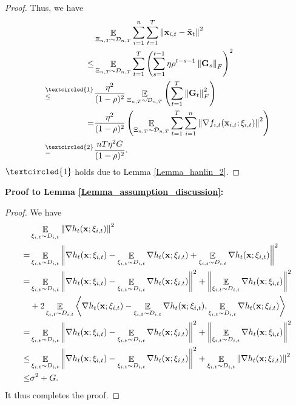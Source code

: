 \documentclass{article}
\begin{document}
\begin{proof}
Thus, we  have
\begin{align}
\nonumber
& \EE_{ \Xi_{n,T} \sim \Dcal_{n,T} } \sum_{i=1}^n\sum_{t=1}^T \lrnorm{\x_{i,t} - \bar{\x}_t}^2  \\ \nonumber 
\le & \EE_{ \Xi_{n,T} \sim \Dcal_{n,T} } \sum_{t=1}^T \lrincir{ \sum_{s=1}^{t-1} \eta \rho^{t-s-1} \lrnorm{\G_s}_F}^2  \\ \nonumber
\refabovecir{\le}{\textcircled{1}} & \frac{\eta^2}{(1-\rho)^2} \EE_{ \Xi_{n,T} \sim \Dcal_{n,T} } \lrincir{  \sum_{t=1}^T \lrnorm{\G_t}_F^2 } \\ \nonumber
= & \frac{\eta^2}{(1-\rho)^2} \lrincir{ \EE_{ \Xi_{n,T} \sim \Dcal_{n,T} } \sum_{t=1}^T \sum_{i=1}^n  \lrnorm{\nabla f_{i,t}(\x_{i,t};\xi_{i,t})}^2 } \\ \nonumber
\refabovecir{=}{\textcircled{2}} & \frac{nT\eta^2 G }{(1-\rho)^2}.
\end{align} $\textcircled{1}$ holds due to Lemma \ref{Lemma_hanlin_2}. 
\end{proof}



\textbf{ Proof to Lemma \ref{Lemma_assumption_discussion}:}
\begin{proof}
We have
\begin{align}
\nonumber
&\mathop{\mathbb{E}}_{ \xi_{i,t} \sim D_{i,t} }\left\lVert\nabla h_t({\bf x};\xi_{i,t})\right\rVert^2 \\ \nonumber 
= & \mathop{\mathbb{E}}_{ \xi_{i,t} \sim D_{i,t} }\left\lVert\nabla h_t({\bf x};\xi_{i,t}) - \mathop{\mathbb{E}}_{ \xi_{i,t} \sim D_{i,t} }\nabla h_t({\bf x};\xi_{i,t}) + \mathop{\mathbb{E}}_{ \xi_{i,t} \sim D_{i,t} }\nabla h_t({\bf x};\xi_{i,t})\right\rVert^2 \\ \nonumber
= & \mathop{\mathbb{E}}_{ \xi_{i,t} \sim D_{i,t} }\left\lVert\nabla h_t({\bf x};\xi_{i,t}) - \mathop{\mathbb{E}}_{ \xi_{i,t} \sim D_{i,t} }\nabla h_t({\bf x};\xi_{i,t})\right\rVert^2 + \left\lVert\mathop{\mathbb{E}}_{ \xi_{i,t} \sim D_{i,t} }\nabla h_t({\bf x};\xi_{i,t})\right\rVert^2 \\ \nonumber
& + 2\mathop{\mathbb{E}}_{ \xi_{i,t} \sim D_{i,t} }\left\langle\nabla h_t({\bf x};\xi_{i,t}) - \mathop{\mathbb{E}}_{ \xi_{i,t} \sim D_{i,t} }\nabla h_t({\bf x};\xi_{i,t}),\mathop{\mathbb{E}}_{ \xi_{i,t} \sim D_{i,t} }\nabla h_t({\bf x};\xi_{i,t}) \right\rangle \\ \nonumber
= & \mathop{\mathbb{E}}_{ \xi_{i,t} \sim D_{i,t} }\left\lVert\nabla h_t({\bf x};\xi_{i,t}) - \mathop{\mathbb{E}}_{ \xi_{i,t} \sim D_{i,t} }\nabla h_t({\bf x};\xi_{i,t})\right\rVert^2 + \left\lVert\mathop{\mathbb{E}}_{ \xi_{i,t} \sim D_{i,t} }\nabla h_t({\bf x};\xi_{i,t})\right\rVert^2  \\ \nonumber
\le & \mathop{\mathbb{E}}_{ \xi_{i,t} \sim D_{i,t} }\left\lVert\nabla h_t({\bf x};\xi_{i,t}) - \mathop{\mathbb{E}}_{ \xi_{i,t} \sim D_{i,t} }\nabla h_t({\bf x};\xi_{i,t})\right\rVert^2 + \mathop{\mathbb{E}}_{ \xi_{i,t} \sim D_{i,t} }\left\lVert\nabla h_t({\bf x};\xi_{i,t})\right\rVert^2  \\ \nonumber
\le & \sigma^2 + G.
\end{align} It thus completes the proof.
\end{proof}
\end{document}
